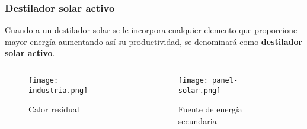 \begin{frame}
	\frametitle{Destilador solar activo}
	
	Cuando a un destilador solar se le incorpora cualquier elemento que proporcione mayor energía aumentando así su productividad, se denominará como \textbf{destilador solar activo}.
	\vspace*{2mm}
	\begin{columns}
		\begin{column}{0.5\textwidth}
			\centering
			\begin{figure}
				\centering
				\texttt{[image: industria.png]}
				\caption{Calor residual}
			\end{figure}
		\end{column}			
		\begin{column}{0.5\textwidth}
			\centering
			\begin{figure}
				\centering
				\texttt{[image: panel-solar.png]}
				\caption{Fuente de energía secundaria}
			\end{figure}
		\end{column}
	\end{columns}
\end{frame}